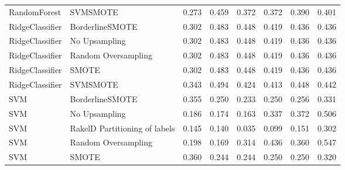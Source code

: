 \begin{tabular}{llllllll}
                   RandomForest &                      SVMSMOTE & 0.273 &                     0.459 &                 0.372 &                  0.372 &                                   0.390 &    0.401 \\
                RidgeClassifier &               BorderlineSMOTE & 0.302 &                     0.483 &                 0.448 &                  0.419 &                                   0.436 &    0.436 \\
                RidgeClassifier &                 No Upsampling & 0.302 &                     0.483 &                 0.448 &                  0.419 &                                   0.436 &    0.436 \\
                RidgeClassifier &           Random Oversampling & 0.302 &                     0.483 &                 0.448 &                  0.419 &                                   0.436 &    0.436 \\
                RidgeClassifier &                         SMOTE & 0.302 &                     0.483 &                 0.448 &                  0.419 &                                   0.436 &    0.436 \\
                RidgeClassifier &                      SVMSMOTE & 0.343 &                     0.494 &                 0.424 &                  0.413 &                                   0.448 &    0.442 \\
                            SVM &               BorderlineSMOTE & 0.355 &                     0.250 &                 0.233 &                  0.250 &                                   0.256 &    0.331 \\
                            SVM &                 No Upsampling & 0.186 &                     0.174 &                 0.163 &                  0.337 &                                   0.372 &    0.506 \\
                            SVM & RakelD Partitioning of labels & 0.145 &                     0.140 &                 0.035 &                  0.099 &                                   0.151 &    0.302 \\
                            SVM &           Random Oversampling & 0.198 &                     0.169 &                 0.314 &                  0.436 &                                   0.360 &    0.547 \\
                            SVM &                         SMOTE & 0.360 &                     0.244 &                 0.244 &                  0.250 &                                   0.250 &    0.320 \\

\end{tabular}
